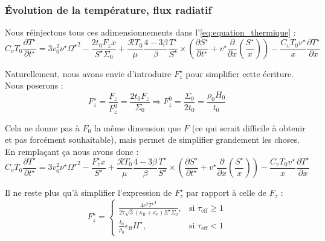 \subsubsection{Évolution de la température, flux radiatif}

Nous réinjectons tous ces adimensionnements dans l’\cref{eq:equation_thermique} :
\begin{equation}
    C_v T_0 \frac{\partial T^{\star}}{\partial t^{\star}} =
    3 v_0^2 \nu^\star {\Omega^\star}^2 - \frac{2 t_0 F_z x}{S^\star \Sigma_0} +
    \frac{\mathcal{R} T_0}{\mu} \frac{4-3\beta}{\beta} \frac{T^\star}{S^\star} \times
    \left( \frac{\partial S^\star}{\partial t^\star} + v^\star \frac{\partial}{\partial x} \left(\frac{S^\star}{x}\right) \right) -
    \frac{C_v T_0 v^\star}{x} \frac{\partial T^\star}{\partial x}
\end{equation}

Naturellement, nous avons envie d’introduire $F_z^\star$ pour simplifier cette
écriture. Nous poserons :
\begin{equation}
    F_z^\star = \frac{F_z}{F_z^0} = \frac{2 t_0 F_z}{\Sigma_0} \Rightarrow F_z^0 = \frac{\Sigma_0}{2 t_0} = \frac{\rho_0 H_0}{t_0}
\end{equation}

Cela ne donne pas à $F_0$ la même dimension que $F$ (ce qui serait difficile à
obtenir et pas forcément souhaitable), mais permet de simplifier grandement les
choses. En remplaçant ça nous avons donc :
\begin{equation}
    C_v T_0 \frac{\partial T^{\star}}{\partial t^{\star}} =
    3 v_0^2 \nu^\star {\Omega^\star}^2 - \frac{F_z^\star x}{S^\star} +
    \frac{\mathcal{R} T_0}{\mu} \frac{4-3\beta}{\beta} \frac{T^\star}{S^\star} \times
    \left( \frac{\partial S^\star}{\partial t^\star} + v^\star \frac{\partial}{\partial x} \left(\frac{S^\star}{x}\right) \right) -
    \frac{C_v T_0 v^\star}{x} \frac{\partial T^\star}{\partial x}
\end{equation}

Il ne reste plus qu’à simplifier l’expression de $F_z^\star$ par rapport à
celle de $F_z$ :
\begin{equation}
    F_z^\star =
    \begin{cases}
        \frac{4 c^2 {T^\star}^4}{27 \sqrt{3} (\kappa_\mathrm{ff} + \kappa_e)\Sigma^\star \Sigma_0}, &\text{si $\tau_\mathrm{eff} \geq 1$} \\
        \frac{t_0}{\rho_0}\epsilon_\mathrm{ff} H^\star, &\text{si $\tau_\mathrm{eff} < 1$}
    \end{cases}
\end{equation}

